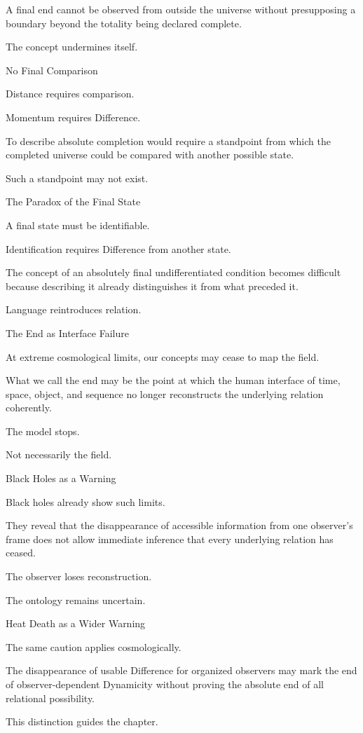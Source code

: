 A final end cannot be observed from outside the universe without presupposing a boundary beyond the totality being declared complete.

The concept undermines itself.

No Final Comparison

Distance requires comparison.

Momentum requires Difference.

To describe absolute completion would require a standpoint from which the completed universe could be compared with another possible state.

Such a standpoint may not exist.

The Paradox of the Final State

A final state must be identifiable.

Identification requires Difference from another state.

The concept of an absolutely final undifferentiated condition becomes difficult because describing it already distinguishes it from what preceded it.

Language reintroduces relation.

The End as Interface Failure

At extreme cosmological limits, our concepts may cease to map the field.

What we call the end may be the point at which the human interface of time, space, object, and sequence no longer reconstructs the underlying relation coherently.

The model stops.

Not necessarily the field.

Black Holes as a Warning

Black holes already show such limits.

They reveal that the disappearance of accessible information from one observer’s frame does not allow immediate inference that every underlying relation has ceased.

The observer loses reconstruction.

The ontology remains uncertain.

Heat Death as a Wider Warning

The same caution applies cosmologically.

The disappearance of usable Difference for organized observers may mark the end of observer-dependent Dynamicity without proving the absolute end of all relational possibility.

This distinction guides the chapter.

